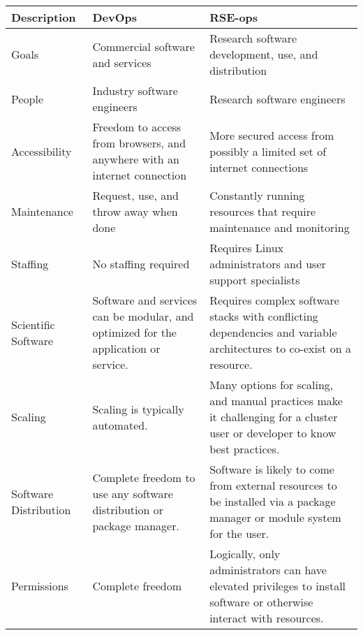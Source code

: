 \begin{minipage}{\linewidth}
\thispagestyle{empty}
\begin{center}
\centering
\begin{tabular}{| p{15em}  p{15em}  p{15em}|} 
 \hline
 Description & DevOps & RSE-ops \\ [0.5ex] 
 \hline\hline
Goals & Commercial software and services & Research software development, use, and distribution \\
 \hline

People & Industry software engineers & Research software engineers \\
 \hline

Accessibility & Freedom to access from browsers, and anywhere with an internet connection & More secured access from possibly a limited set of internet connections  \\
 \hline

Maintenance & Request, use, and throw away when done & Constantly running resources that require maintenance and monitoring \\
 \hline

Staffing & No staffing required & Requires Linux administrators and user support specialists  \\
 \hline

Scientific Software & Software and services can be modular, and optimized for the application or service. & Requires complex software stacks with conflicting dependencies and variable architectures to co-exist on a resource. \\
 \hline

Scaling &  Scaling is typically automated. & Many options for scaling, and manual practices make it challenging for a cluster user or developer to know best practices.\\
  \hline

Software Distribution &  Complete freedom to use any software distribution or package manager. & Software is likely to come from external resources to be installed via a package manager or module system for the user. \\
\hline

Permissions & Complete freedom & Logically, only administrators can have elevated privileges to install software or otherwise interact with resources. \\
\hline


\end{tabular}
\end{center}
\end{minipage}
